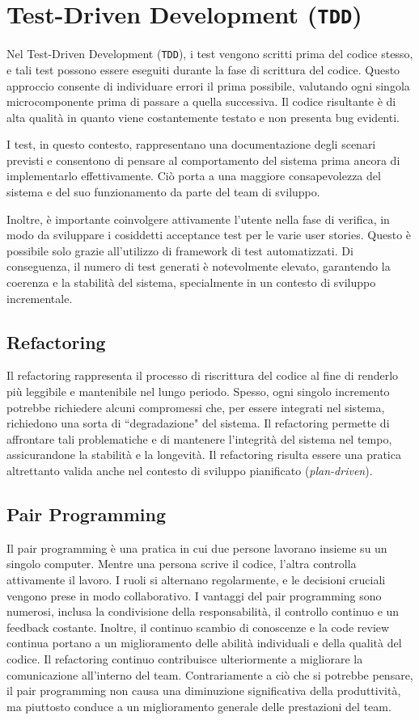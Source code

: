\section{Test-Driven Development (\texttt{TDD})}
Nel Test-Driven Development (\texttt{TDD}), i test vengono scritti prima del codice stesso, e tali test possono essere eseguiti durante la fase
di scrittura del codice. Questo approccio consente di individuare errori il prima possibile, valutando ogni singola microcomponente
prima di passare a quella successiva. Il codice risultante è di alta qualità in quanto viene costantemente testato e non presenta bug
evidenti.

I test, in questo contesto, rappresentano una documentazione degli scenari previsti e consentono di pensare al comportamento del sistema
prima ancora di implementarlo effettivamente. Ciò porta a una maggiore consapevolezza del sistema e del suo funzionamento da parte del
team di sviluppo.

Inoltre, è importante coinvolgere attivamente l'utente nella fase di verifica, in modo da sviluppare i cosiddetti acceptance test per le
varie user stories. Questo è possibile solo grazie all'utilizzo di framework di test automatizzati. Di conseguenza, il numero di test
generati è notevolmente elevato, garantendo la coerenza e la stabilità del sistema, specialmente in un contesto di sviluppo incrementale.

\subsection{Refactoring}
Il refactoring rappresenta il processo di riscrittura del codice al fine di renderlo più leggibile e mantenibile nel lungo periodo.
Spesso, ogni singolo incremento potrebbe richiedere alcuni compromessi che, per essere integrati nel sistema, richiedono una sorta di
``degradazione" del sistema. Il refactoring permette di affrontare tali problematiche e di mantenere l'integrità del sistema nel tempo,
assicurandone la stabilità e la longevità. Il refactoring risulta essere una pratica altrettanto valida anche nel contesto di sviluppo
pianificato (\textit{plan-driven}).

\subsection{Pair Programming}
Il pair programming è una pratica in cui due persone lavorano insieme su un singolo computer. Mentre una persona scrive il codice,
l'altra controlla attivamente il lavoro. I ruoli si alternano regolarmente, e le decisioni cruciali vengono prese in modo collaborativo.
I vantaggi del pair programming sono numerosi, inclusa la condivisione della responsabilità, il controllo continuo e un feedback costante.
Inoltre, il continuo scambio di conoscenze e la code review continua portano a un miglioramento delle abilità individuali e della qualità
del codice. Il refactoring continuo contribuisce ulteriormente a migliorare la comunicazione all'interno del team. Contrariamente a ciò
che si potrebbe pensare, il pair programming non causa una diminuzione significativa della produttività, ma piuttosto conduce a un miglioramento
generale delle prestazioni del team.
